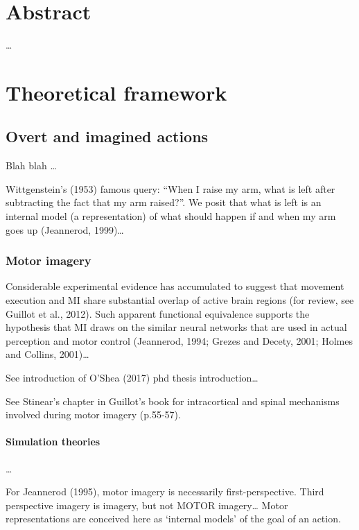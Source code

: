 \documentclass[12pt,]{book}
\theoremstyle{definition}
\theoremstyle{definition}
\theoremstyle{definition}
\theoremstyle{remark}
\begin{document}
\chapter*{Abstract}\label{abstract}

\ldots{}

\chapter{Theoretical framework}\label{intro}

\section{Overt and imagined actions}\label{intro}

Blah blah \citep{koster_rumination_2013}\ldots{}

Wittgenstein's (1953) famous query: ``When I raise my arm, what is left
after subtracting the fact that my arm raised?''. We posit that what is
left is an internal model (a representation) of what should happen if
and when my arm goes up (Jeannerod, 1999)\ldots{}

\subsection{Motor imagery}\label{motor-imagery}

Considerable experimental evidence has accumulated to suggest that
movement execution and MI share substantial overlap of active brain
regions (for review, see Guillot et al., 2012). Such apparent functional
equivalence supports the hypothesis that MI draws on the similar neural
networks that are used in actual perception and motor control
(Jeannerod, 1994; Grezes and Decety, 2001; Holmes and Collins,
2001)\ldots{}

See introduction of O'Shea (2017) phd thesis introduction\ldots{}

See Stinear's chapter in Guillot's book for intracortical and spinal
mechanisms involved during motor imagery (p.55-57).

\subsubsection{Simulation theories}\label{simulation-theories}

\ldots{}

For Jeannerod (1995), motor imagery is necessarily first-perspective.
Third perspective imagery is imagery, but not MOTOR imagery\ldots{}
Motor representations are conceived here as `internal models' of the
goal of an action.
\end{document}
